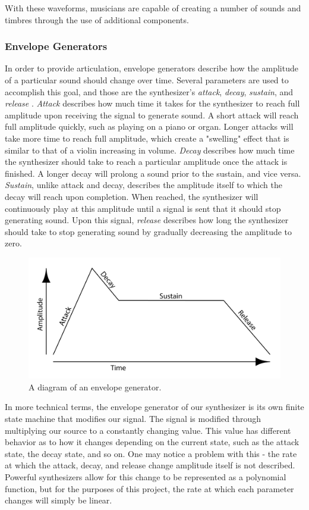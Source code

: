 \documentclass[12pt]{article}
\begin{document}
With these waveforms, musicians are capable of creating a number of sounds and timbres through the use of additional components.

\subsubsection{Envelope Generators}
In order to provide articulation, envelope generators describe how the amplitude of a particular sound should change over time. Several parameters are used to accomplish this goal, and those are the synthesizer's \textit{attack}, \textit{decay}, \textit{sustain}, and \textit{release} \cite{Pirkle_2021}. \textit{Attack} describes how much time it takes for the synthesizer to reach full amplitude upon receiving the signal to generate sound. A short attack will reach full amplitude quickly, such as playing on a piano or organ. Longer attacks will take more time to reach full amplitude, which create a "swelling" effect that is similar to that of a violin increasing in volume. \textit{Decay} describes how much time the synthesizer should take to reach a particular amplitude once the attack is finished. A longer decay will prolong a sound prior to the sustain, and vice versa. \textit{Sustain}, unlike attack and decay, describes the amplitude itself to which the decay will reach upon completion. When reached, the synthesizer will continuously play at this amplitude until a signal is sent that it should stop generating sound. Upon this signal, \textit{release} describes how long the synthesizer should take to stop generating sound by gradually decreasing the amplitude to zero. 

\begin{figure}[h]
	\centering
	\includegraphics[scale=0.175]{adsr.png}
	\caption{A diagram of an envelope generator.}
\end{figure}


In more technical terms, the envelope generator of our synthesizer is its own finite state machine that modifies our signal. The signal is modified through multiplying our source to a constantly changing value. This value has different behavior as to how it changes depending on the current state, such as the attack state, the decay state, and so on. One may notice a problem with this - the rate at which the attack, decay, and release change amplitude itself is not described. Powerful synthesizers allow for this change to be represented as a polynomial function, but for the purposes of this project, the rate at which each parameter changes will simply be linear. 
\end{document}
